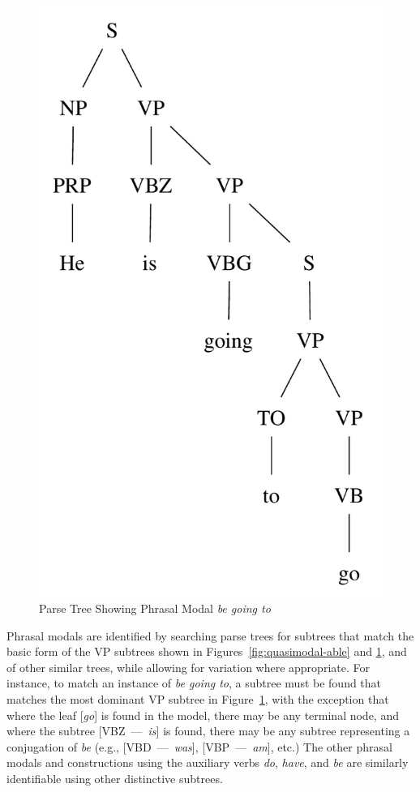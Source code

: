 \documentclass[main.tex]{subfiles}
\begin{document}
\begin{figure}[htb]
\centering
\includegraphics[scale=0.53]{modal-going.pdf}
\caption{Parse Tree Showing Phrasal Modal \textit{be going to}}
\label{fig:quasimodal-going}
\end{figure}

Phrasal modals are identified by searching parse trees for subtrees that match the basic form of the VP subtrees shown in Figures~\ref{fig:quasimodal-able} and \ref{fig:quasimodal-going}, and of other similar trees, while allowing for variation where appropriate. For instance, to match an instance of \textit{be going to}, a subtree must be found that matches the most dominant VP subtree in Figure~\ref{fig:quasimodal-going}, with the exception that where the leaf [\textit{go}] is found in the model, there may be any terminal node, and where the subtree [VBZ~---~\textit{is}] is found, there may be any subtree representing a conjugation of \textit{be} (e.g., [VBD~---~\textit{was}], [VBP~---~\textit{am}], etc.) The other phrasal modals and constructions using the auxiliary verbs \textit{do}, \textit{have}, and \textit{be} are similarly identifiable using other distinctive subtrees.
\end{document}
